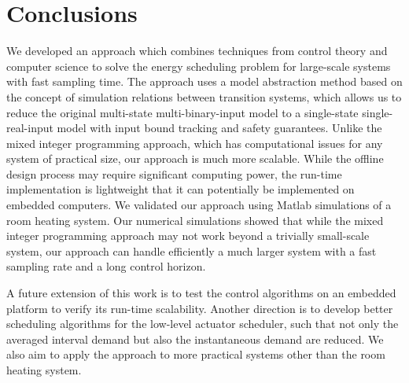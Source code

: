 \section{Conclusions}
\label{sec:conclusions}

We developed an approach which combines techniques from control theory and computer science to solve the energy scheduling problem for large-scale systems with fast sampling time.
The approach uses a model abstraction method based on the concept of simulation relations between transition systems, which allows us to reduce the original multi-state multi-binary-input model to a single-state single-real-input model with input bound tracking and safety guarantees.
Unlike the mixed integer programming approach, which has computational issues for any system of practical size, our approach is much more scalable.
While the offline design process may require significant computing power, the run-time implementation is lightweight that it can potentially be implemented on embedded computers.
We validated our approach using Matlab simulations of a room heating system.
Our numerical simulations showed that while the mixed integer programming approach may not work beyond a trivially small-scale system, our approach can handle efficiently a much larger system with a fast sampling rate and a long control horizon.


A future extension of this work is to test the control algorithms on an embedded platform to verify its run-time scalability.
Another direction is to develop better scheduling algorithms for the low-level actuator scheduler, such that not only the averaged interval demand but also the instantaneous demand are reduced.
We also aim to apply the approach to more practical systems other than the room heating system.

